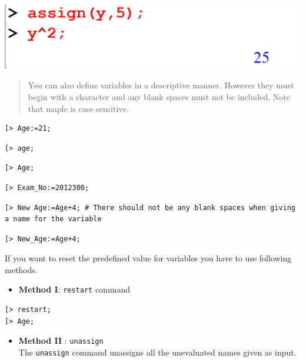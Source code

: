 \documentclass[
]{book}
\providecommand{\tightlist}{%
  \setlength{\itemsep}{0pt}\setlength{\parskip}{0pt}}
\theoremstyle{definition}
\theoremstyle{definition}
\theoremstyle{definition}
\theoremstyle{definition}
\theoremstyle{remark}
\begin{document}
\includegraphics{figures/Lesson 1/fig57.png}

\begin{quote}
You can also define variables in a descriptive manner. However they must begin with a character and any blank spaces must not be included. Note that maple is case sensitive.
\end{quote}

\begin{verbatim}
[> Age:=21;
\end{verbatim}

\begin{verbatim}
[> age;
\end{verbatim}

\begin{verbatim}
[> Age;
\end{verbatim}

\begin{verbatim}
[> Exam_No:=2012300;
\end{verbatim}

\begin{verbatim}
[> New Age:=Age+4; # There should not be any blank spaces when giving a name for the variable
\end{verbatim}

\begin{verbatim}
[> New_Age:=Age+4;
\end{verbatim}

If you want to reset the predefined value for variables you have to use following methods.

\begin{itemize}
\tightlist
\item
  \textbf{Method I}: \texttt{restart} command\\
\end{itemize}

\begin{verbatim}
[> restart;
[> Age;
\end{verbatim}

\begin{itemize}
\tightlist
\item
  \textbf{Method II} : \texttt{unassign}\\
  The \texttt{unassign} command unassigns all the unevaluated names given as input.
\end{itemize}
\end{document}
